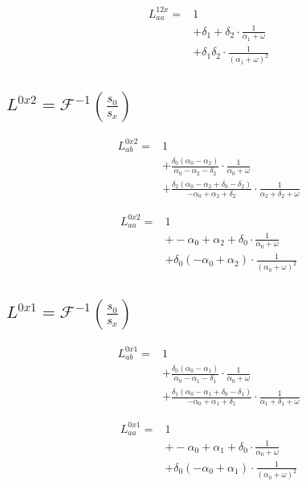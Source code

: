 \documentclass[a4paper,10pt]{article}
\begin{document}
\begin{align*}
 L^{12x}_{aa}  =&1\\
&+ \delta_{1} + \delta_{2} \cdot \frac{1}{\alpha_{1} + \omega}\\
&+ \delta_{1} \delta_{2} \cdot \frac{1}{\left(\alpha_{1} + \omega\right)^{2}}
\end{align*}
\subsection{$L^{0x2} = \mathcal{F}^{-1}(\frac{s_{0}}{s_{x}})$}


\begin{align*}
 L^{0x2}_{ab}  =&1\\
&+ \frac{\delta_{0} \left(\alpha_{0} - \alpha_{2}\right)}{\alpha_{0} - \alpha_{2} - \delta_{2}} \cdot \frac{1}{\alpha_{0} + \omega}\\
&+ \frac{\delta_{2} \left(\alpha_{0} - \alpha_{2} + \delta_{0} - \delta_{2}\right)}{- \alpha_{0} + \alpha_{2} + \delta_{2}} \cdot \frac{1}{\alpha_{2} + \delta_{2} + \omega}
\end{align*}

\begin{align*}
 L^{0x2}_{aa}  =&1\\
&+ - \alpha_{0} + \alpha_{2} + \delta_{0} \cdot \frac{1}{\alpha_{0} + \omega}\\
&+ \delta_{0} \left(- \alpha_{0} + \alpha_{2}\right) \cdot \frac{1}{\left(\alpha_{0} + \omega\right)^{2}}
\end{align*}
\subsection{$L^{0x1} = \mathcal{F}^{-1}(\frac{s_{0}}{s_{x}})$}


\begin{align*}
 L^{0x1}_{ab}  =&1\\
&+ \frac{\delta_{0} \left(\alpha_{0} - \alpha_{1}\right)}{\alpha_{0} - \alpha_{1} - \delta_{1}} \cdot \frac{1}{\alpha_{0} + \omega}\\
&+ \frac{\delta_{1} \left(\alpha_{0} - \alpha_{1} + \delta_{0} - \delta_{1}\right)}{- \alpha_{0} + \alpha_{1} + \delta_{1}} \cdot \frac{1}{\alpha_{1} + \delta_{1} + \omega}
\end{align*}

\begin{align*}
 L^{0x1}_{aa}  =&1\\
&+ - \alpha_{0} + \alpha_{1} + \delta_{0} \cdot \frac{1}{\alpha_{0} + \omega}\\
&+ \delta_{0} \left(- \alpha_{0} + \alpha_{1}\right) \cdot \frac{1}{\left(\alpha_{0} + \omega\right)^{2}}
\end{align*}
\end{document}
